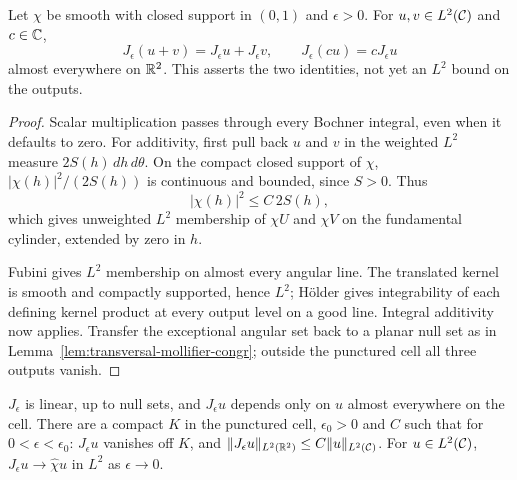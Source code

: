 \begin{lemma}
\label{lem:transversal-mollifier-linear}
\leanok
Let $\chi$ be smooth with closed support in $(0,1)$ and $\epsilon>0$.
For $u,v\in L^2(\mathcal{C})$ and $c\in\mathbb{C}$,
\[
  J_\epsilon(u+v)=J_\epsilon u+J_\epsilon v,\qquad
  J_\epsilon(cu)=cJ_\epsilon u
\]
almost everywhere on $\mathbb{R}^2$. This asserts the two identities, not yet an
$L^2$ bound on the outputs.
\end{lemma}

\begin{proof}
\leanok
Scalar multiplication passes through every Bochner integral, even when it
defaults to zero. For additivity, first pull back $u$ and $v$ in the weighted
$L^2$ measure $2S(h)\,dh\,d\theta$. On the compact closed support of $\chi$,
$|\chi(h)|^2/(2S(h))$ is continuous and bounded, since $S>0$. Thus
\[
  |\chi(h)|^2\le C\,2S(h),
\]
which gives unweighted $L^2$ membership of $\chi U$ and $\chi V$ on the
fundamental cylinder, extended by zero in $h$.

Fubini gives $L^2$ membership on almost every angular line. The translated
kernel is smooth and compactly supported, hence $L^2$; H\"older gives
integrability of each defining kernel product at every output level on a
good line. Integral additivity now applies. Transfer the exceptional angular
set back to a planar null set as in
Lemma~\ref{lem:transversal-mollifier-congr}; outside the punctured cell all
three outputs vanish.
\end{proof}

\begin{lemma}
\label{lem:transversal-mollifier}
\leanok
$J_\epsilon$ is linear, up to null sets, and $J_\epsilon u$ depends only on $u$ almost everywhere on the
cell. There are a compact $K$ in the punctured cell, $\epsilon_0>0$ and $C$ such that for
$0<\epsilon<\epsilon_0$: $J_\epsilon u$ vanishes off $K$, and $\|J_\epsilon u\|_{L^2(\mathbb{R}^2)}\le
C\|u\|_{L^2(\mathcal{C})}$. For $u\in L^2(\mathcal{C})$, $J_\epsilon u\to\hat\chi u$ in $L^2$ as $\epsilon\to0$.
\end{lemma}

